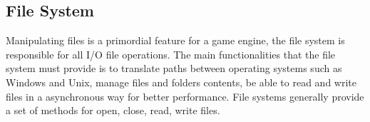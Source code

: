 \subsection{File System}
Manipulating files is a primordial feature for a game engine, the file system is responsible for all I/O file operations. The main functionalities that the file system must provide is to translate paths between operating systems such as Windows and Unix, manage files and folders contents, be able to read and write files in a asynchronous way for better performance. File systems generally provide a set of methods for open, close, read, write files\cite{GameEngineArchitecture}.